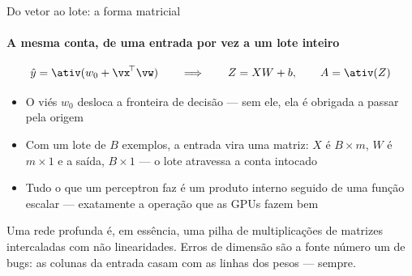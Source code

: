 \documentclass[aspectratio=169, 11pt]{beamer}
\begin{document}
\begin{frame}{Do vetor ao lote: a forma matricial}
  \framesubtitle{A mesma conta, de uma entrada por vez a um lote inteiro}

  \[
    \hat{y} = \ativ(w_0 + \vx^{\!\top}\vw)
    \qquad\Longrightarrow\qquad
    Z = XW + b, \qquad A = \ativ(Z)
  \]

  \begin{itemize}\setlength{\itemsep}{0.35ex}
    \item O viés $w_0$ desloca a fronteira de decisão — sem ele, ela é
          obrigada a passar pela origem
    \item Com um lote de $B$ exemplos, a entrada vira uma matriz: $X$ é
          $B{\times}m$, $W$ é $m{\times}1$ e a saída, $B{\times}1$ — o lote
          atravessa a conta intocado
    \item Tudo o que um perceptron faz é um produto interno seguido de uma
          função escalar — exatamente a operação que as GPUs fazem bem
  \end{itemize}

  \begin{ideiabox}
    Uma rede profunda é, em essência, uma pilha de multiplicações de matrizes
    intercaladas com não linearidades. Erros de dimensão são a fonte número
    um de bugs: as colunas da entrada casam com as linhas dos pesos — sempre.
  \end{ideiabox}
\end{frame}
\end{document}
